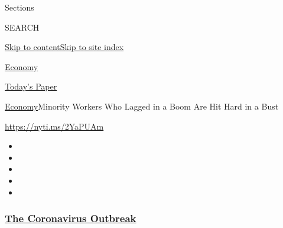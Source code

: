 Sections

SEARCH

\protect\hyperlink{site-content}{Skip to
content}\protect\hyperlink{site-index}{Skip to site index}

\href{https://www.nytimes3xbfgragh.onion/section/business/economy}{Economy}

\href{https://myaccount.nytimes3xbfgragh.onion/auth/login?response_type=cookie\&client_id=vi}{}

\href{https://www.nytimes3xbfgragh.onion/section/todayspaper}{Today's
Paper}

\href{/section/business/economy}{Economy}\textbar{}Minority Workers Who
Lagged in a Boom Are Hit Hard in a Bust

\url{https://nyti.ms/2YaPUAm}

\begin{itemize}
\item
\item
\item
\item
\item
\end{itemize}

\hypertarget{the-coronavirus-outbreak}{%
\subsubsection{\texorpdfstring{\href{https://www.nytimes3xbfgragh.onion/news-event/coronavirus?name=styln-coronavirus-markets\&region=TOP_BANNER\&block=storyline_menu_recirc\&action=click\&pgtype=Article\&impression_id=167365d0-f4b9-11ea-8ebe-179a99a195cb\&variant=undefined}{The
Coronavirus
Outbreak}}{The Coronavirus Outbreak}}\label{the-coronavirus-outbreak}}

